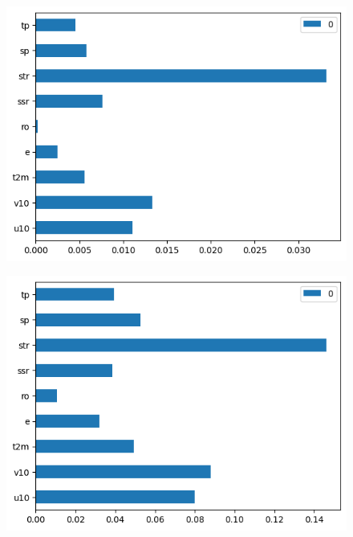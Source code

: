 \begin{figure}[H]
    \centering
    \includegraphics[width=\textwidth]{images/svr_mse_bar.png}
    \caption{}
    \label{svr-mse-bar}
\end{figure}

\begin{figure}[H]
    \centering
    \includegraphics[width=\textwidth]{images/svr_mae_bar.png}
    \caption{}
    \label{svr-mae-bar}
\end{figure}

